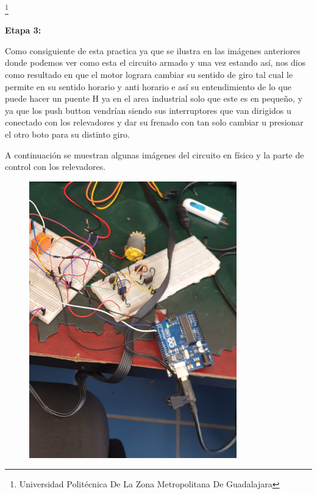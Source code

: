 \documentclass[10pt,a4paper]{article}
\begin{document}
\footnote{Universidad Politécnica De La Zona Metropolitana De Guadalajara} 

\newpage

\textbf{Etapa 3:}

Como consiguiente de esta practica ya que se ilustra en las imágenes anteriores donde podemos ver como esta el circuito armado y una vez estando así, nos dios como resultado en que el motor lograra cambiar su sentido de giro tal cual le permite en su sentido horario y anti horario e así su entendimiento de lo que puede hacer un puente H ya en el area industrial solo que este es en pequeño, y ya que los push button vendrían siendo sus interruptores que van dirigidos u conectado con los relevadores y dar su frenado con tan solo cambiar u presionar el otro boto para su distinto giro.

A continuación se muestran algunas imágenes del circuito en físico y la parte de control con los relevadores.

\begin{figure}[hbtp]
\includegraphics[scale=0.5]{4.png} 
\centering
\end{figure}
\end{document}
